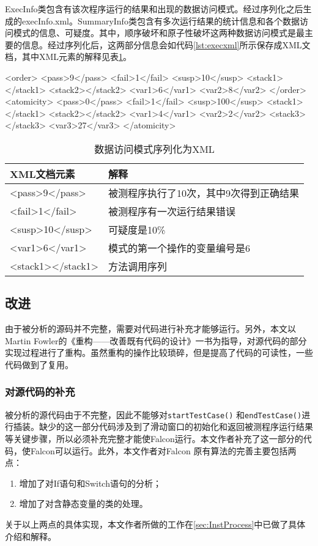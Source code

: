 ExecInfo类包含有该次程序运行的结果和出现的数据访问模式。经过序列化之后生成的execInfo.xml。SummaryInfo类包含有多次运行结果的统计信息和各个数据访问模式的信息、可疑度。其中，顺序破坏和原子性破坏这两种数据访问模式是最主要的信息。经过序列化后，这两部分信息会如代码\ref{lst:execxml}所示保存成XML文档，其中XML元素的解释见表\ref{tab:execXMLele}。\\
\begin{code}[language=XML, label=lst:execxml, caption=execInfo.xml片段]
<order>
    <pass>9</pass>
    <fail>1</fail>
    <susp>10</susp>
    <stack1></stack1>
    <stack2></stack2>
    <var1>6</var1>
    <var2>8</var2>
</order>
<atomicity>
    <pass>0</pass>
    <fail>1</fail>
    <susp>100</susp>
    <stack1></stack1>
    <stack2></stack2>
    <var1>4</var1>
    <var2>2</var2>
    <stack3></stack3>
    <var3>27</var3>
</atomicity>
\end{code}
\begin{table}[!ht]
    \centering
    \caption{数据访问模式序列化为XML}\label{tab:execXMLele}
    \begin{tabular}{|l|l|}
      \hline
      XML文档元素 & 解释\\\hline
       <pass>9</pass> & 被测程序执行了10次，其中9次得到正确结果\\\hline
       <fail>1</fail> & 被测程序有一次运行结果错误\\\hline
       <susp>10</susp> & 可疑度是10\%\\\hline
       <var1>6</var1> & 模式的第一个操作的变量编号是6\\\hline
       <stack1></stack1> & 方法调用序列\\\hline
    \end{tabular}
\end{table}
\subsection{改进}
由于被分析的源码并不完整，需要对代码进行补充才能够运行。另外，本文以Martin Fowler的《重构——改善既有代码的设计》一书为指导，对源代码的部分实现过程进行了重构。虽然重构的操作比较琐碎，但是提高了代码的可读性，一些代码做到了复用。
\subsubsection{对源代码的补充}
被分析的源代码由于不完整，因此不能够对\texttt{startTestCase()} 和\texttt{endTestCase()}进行插装。缺少的这一部分代码涉及到了滑动窗口的初始化和返回被测程序运行结果等关键步骤，所以必须补充完整才能使Falcon运行。本文作者补充了这一部分的代码，使Falcon可以运行。此外，本文作者对Falcon 原有算法的完善主要包括两点：
\begin{enumerate}
  \item 增加了对If语句和Switch语句的分析；
  \item 增加了对含静态变量的类的处理。
\end{enumerate}
关于以上两点的具体实现，本文作者所做的工作在\ref{sec:InstProcess}中已做了具体介绍和解释。
